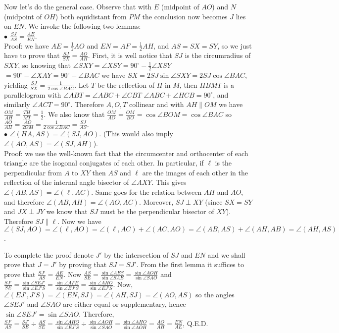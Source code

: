 \documentclass[11pt,a4paper]{article}
\begin{document}
\begin{itemize}
Now let's do the general case. Observe that with $E$ (midpoint of $AO$) and $N$ (midpoint of $OH$) both equidistant from $PM$ the conclusion now becomes $J$ lies on $EN$. We invoke the following two lemmas:\\ 
$\bullet$ $\frac {SJ}{AS}=\frac {AE}{EN}$.\\
Proof: we have $AE=\frac 12 AO$ and $EN=AF=\frac 12 AH$, and $AS=SX=SY$, 
so we just have to prove that 
$\frac {SJ}{SX}=\frac {AO}{AH}$.
First, it is well notice that $SJ$ is the circumradius of $SXY$, so knowing that $\angle SXY=\angle XSY=90^{\circ}-\frac 12\angle XSY$
$= 90^{\circ}-\angle XAY=90^{\circ}-\angle BAC$ we have 
$SX=2SJ\sin\angle SXY=2SJ\cos\angle BAC$, yielding $\frac {SJ}{SX}=\frac {1}{2\cos\angle BAC}$.
Let $T$ be the reflection of $H$ in $M$, then $HBMT$ is a parallelogram with $\angle ABT=\angle ABC+\angle CBT$
$\angle ABC+\angle HCB=90^{\circ}$, and similarly $\angle ACT=90^{\circ}$. 
Therefore $A, O, T$ collinear and with $AH\parallel OM$ we have $\frac{OM}{AH}=\frac {TH}{MT}=\frac 12$. 
We also know that $\frac {OM}{AO}=\frac {OM}{BO}=\cos\angle BOM=\cos\angle BAC$
so $\frac {AO}{AH}=\frac {AO}{2OM}=\frac 1{2\cos\angle BAC}=\frac {SJ}{AS}$.\\ 
$\bullet$ $\angle (HA, AS)=\angle (SJ, AO)$. (This would also imply $\angle (AO, AS)=\angle (SJ, AH)$).\\
Proof: we use the well-known fact that the circumcenter and orthocenter of each triangle are the isogonal conjugates of each other. 
In particular, if $\ell$ is the perpendicular from $A$ to $XY$ then $AS$ and $\ell$ are the images of each other in the reflection of the internal angle bisector of $\angle AXY$. 
This gives $\angle (AB, AS)=\angle (\ell, AC)$. 
Same goes for the relation between $AH$ and $AO$, and therefore $\angle (AB, AH)=\angle (AO, AC)$. 
Moreover, $SJ\perp XY$ (since $SX=SY$ and $JX\perp JY$ we know that $SJ$ must be the perpendicular bisector of $XY$). 
Therefore $SJ\parallel \ell$. 
Now we have $\angle (SJ, AO)=\angle (\ell, AO)=\angle (\ell, AC)+\angle (AC, AO)=\angle (AB, AS)+\angle (AH, AB)=\angle (AH, AS)$. 

To complete the proof denote $J'$ by the intersection of $SJ$ and $EN$ and we shall prove that $J=J'$ by proving that $SJ=SJ'$. 
From the first lemma it suffices to prove that  $\frac {SJ'}{AS}=\frac {AE}{EN}$. 
Now $\frac {AS}{SE}=\frac{\sin\angle AES}{\sin\angle SAE}=\frac{\sin\angle AOH}{\sin\angle SAO}$ and 
$\frac{SJ'}{SE}=\frac{\sin\angle SEJ'}{\sin\angle EJ'S}=\frac{\sin\angle AFE}{\sin\angle EJ'S}=\frac{\sin\angle AHO}{\sin\angle EJ'S}$. 
Now, $\angle (EJ', J'S)=\angle (EN, SJ)=\angle (AH, SJ)=\angle (AO, AS)$ so the angles $\angle SEJ'$ and $\angle SAO$ are either equal or supplementary, hence $\sin\angle SEJ'=\sin\angle SAO$. 
Therefore, $\frac {SJ'}{AS}=\frac {SJ'}{SE}\div \frac {AS}{SE}= \frac{\sin\angle AHO}{\sin\angle EJ'S}\div\frac{\sin\angle AOH}{\sin\angle SAO}=\frac{\sin\angle AHO}{\sin\angle AOH}=\frac{AO}{AH}=\frac {EN}{AE}$, Q.E.D.


\end{itemize}
\end{document}
